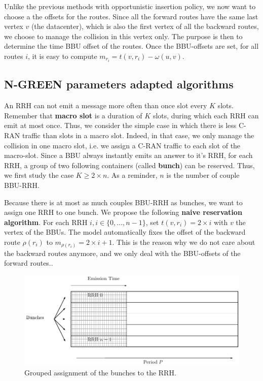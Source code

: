 \documentclass[]{algotel}
\begin{document}
  
Unlike the previous methods with opportunistic insertion policy, we now want to choose a the offsets for the routes. Since all the forward routes have the same last vertex $v$ (the datacenter), which is also the first vertex of all the backward routes, we choose to manage the collision in this vertex only. The purpose is then to determine the time BBU offset of the routes. Once the BBU-offsets are set, for all routes $i$, it is easy to compute $m_{r_i} = t(v,r_i) - \omega(u,v)$.


\subsection{N-GREEN parameters adapted algorithms}
An RRH can not emit a message more often than once slot every $K$ slots. Remember that {\bf macro slot} is a duration of $K$ slots, during which each RRH can emit at most once. Thus, we consider the simple case in which there is less C-RAN traffic than slots in a macro slot. Indeed, in that case, we only manage the collision in one macro slot, i.e. we assign a C-RAN traffic to each slot of the macro-slot. Since a BBU always instantly emits an answer to it's RRH, for each RRH, a group of two following containers (called {\bf bunch}) can be reserved. Thus, we first study the case $K \ge 2\times n$. As a reminder, $n$ is the number of couple BBU-RRH. 

 
 Because there is at most as much couples BBU-RRH as bunches, we want to assign one RRH to one bunch.
We propose the following {\bf naive reservation algorithm}. For each RRH $i, i\in \{0,...,n-1\} $, set $t(v,r_i)= 2\times i$ with $v$ the vertex of the BBUs. The model automatically fixes the offset of the backward route $\rho(r_i)$ to $m_{\rho(r_i)}= 2\times i +1$. This is the reason why we do not care about the backward routes anymore, and we only deal with the BBU-offsets of the forward routes..
   \begin{figure}[h]
\centering
      \includegraphics[scale=0.7]{freqgrouped.pdf}
     \caption{Grouped assignment of the bunches to the RRH.}   \label{fig:freqG}
  \end{figure}
\end{document}
